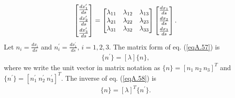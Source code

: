 \documentclass{AeroStructure-ERJohnson}
\begin{document}
\begin{align}\label{eqA.57}
\left[\begin{array}{@{}l@{}}\frac{d x_{1}^{\prime}}{d s} \\[3pt]\frac{d x_{2}^{\prime}}{d s} \\[3pt]\frac{d x_{3}^{\prime}}{d s}\end{array}\right]=\left[\begin{array}{@{}lll@{}}\lambda_{11} & \lambda_{12} & \lambda_{13} \\\lambda_{21} & \lambda_{22} & \lambda_{23} \\\lambda_{31} & \lambda_{32} & \lambda_{33}\end{array}\right]\left[\begin{array}{@{}l@{}}\frac{d x_{1}}{d s} \\[3pt]\frac{d x_{2}}{d s} \\[3pt]\frac{d x_{3}}{d s}\end{array}\right].
\end{align}
Let $n_{i}=\frac{d x_{i}}{d s}$ and $n_{i}^{\prime}=\frac{d x_{1}^{\prime}}{d s}$, $i=1,2,3$. The matrix form of eq. (\ref{eqA.57}) is
\begin{align}\label{eqA.58}
\{n^{\prime}\}=[\lambda]\{n\},
\end{align}
where we write the unit vector in matrix notation as $\{n\}=[n_{1}\ n_{2}\ n_{3}]^{T}$ and  $\{n^{\prime}\}=[n_{1}^{\prime}\ n_{2}^{\prime}\ n_{3}^{\prime}]^{T}$. The inverse of eq. (\ref{eqA.58}) is
\begin{align}\label{eqA.59}
\{n\}=[\lambda]^{T}\{n^{\prime}\}.
\end{align}
\end{document}
